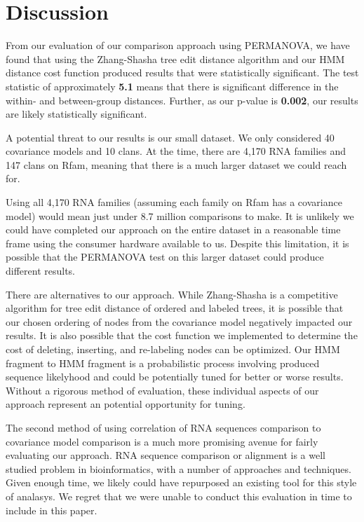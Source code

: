 \section{Discussion}
\label{sec:discussion}

From our evaluation of our comparison approach using PERMANOVA, we have found that using the Zhang-Shasha tree edit distance algorithm and our HMM distance cost function produced results that were statistically significant.
The test statistic of approximately \textbf{5.1} means that there is significant difference in the within- and between-group distances.
Further, as our p-value is \textbf{0.002}, our results are likely statistically significant.

A potential threat to our results is our small dataset.
We only considered 40 covariance models and 10 clans.
At the time, there are 4,170 RNA families and 147 clans on Rfam, meaning that there is a much larger dataset we could reach for.

Using all 4,170 RNA families (assuming each family on Rfam has a covariance model) would mean just under 8.7 million comparisons to make.
It is unlikely we could have completed our approach on the entire dataset in a reasonable time frame using the consumer hardware available to us.
Despite this limitation, it is possible that the PERMANOVA test on this larger dataset could produce different results.

There are alternatives to our approach.
While Zhang-Shasha is a competitive algorithm for tree edit distance of ordered and labeled trees, it is possible that our chosen ordering of nodes from the covariance model negatively impacted our results.
It is also possible that the cost function we implemented to determine the cost of deleting, inserting, and re-labeling nodes can be optimized.
Our HMM fragment to HMM fragment is a probabilistic process involving produced sequence likelyhood and could be potentially tuned for better or worse results.
Without a rigorous method of evaluation, these individual aspects of our approach represent an potential opportunity for tuning.

The second method of using correlation of RNA sequences comparison to covariance model comparison is a much more promising avenue for fairly evaluating our approach.
RNA sequence comparison or alignment is a well studied problem in bioinformatics, with a number of approaches and techniques.
Given enough time, we likely could have repurposed an existing tool for this style of analasys.
We regret that we were unable to conduct this evaluation in time to include in this paper.

